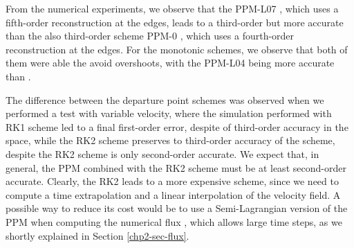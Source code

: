 From the numerical experiments, we observe that the PPM-L07 \citep{putman:2007},
which uses a fifth-order reconstruction at the edges, leads to a third-order but more
accurate than the also third-order scheme PPM-0 \citep{colella:1984}, 
which uses a fourth-order reconstruction at the edges. 
For the monotonic schemes, we observe that both of them were able the avoid
overshoots, with the PPM-L04 \citep{lin:2004} being more accurate than \citep{colella:1984}.

The difference between the  departure point schemes was observed 
when we performed a test with variable velocity,
where the simulation performed with RK1 scheme led to a final first-order error, despite
of third-order accuracy in the space, while the RK2 scheme preserves to 
third-order accuracy of the scheme, despite the RK2 scheme is only second-order accurate.
We expect that, in general, the PPM combined with the RK2 scheme must be at least second-order
accurate.
Clearly, the RK2 leads to a more expensive scheme, since
we need to compute a time extrapolation and a linear interpolation of the velocity field.
A possible way to reduce its cost would be to use a Semi-Lagrangian version of the PPM
when computing the numerical flux \citep{chen:2017}, which allows large time steps,
as we shortly explained in Section \ref{chp2-sec-flux}.


